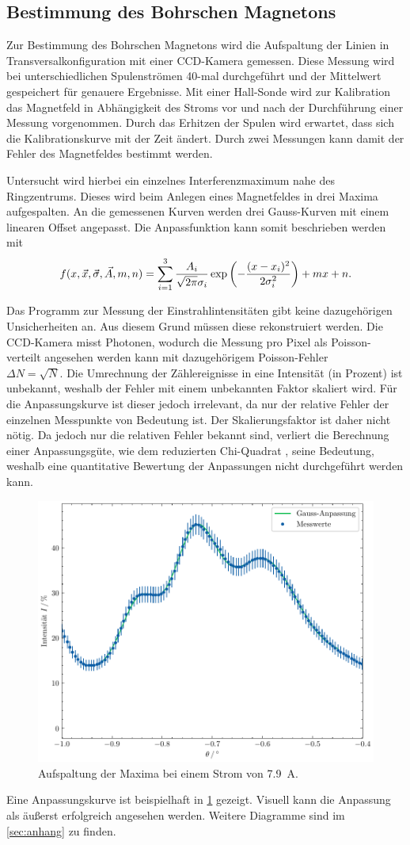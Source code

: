 \subsection{Bestimmung des Bohrschen Magnetons}
Zur Bestimmung des Bohrschen Magnetons wird die Aufspaltung der Linien 
in Transversalkonfiguration mit einer CCD-Kamera gemessen. Diese Messung wird 
bei unterschiedlichen Spulenströmen 40-mal durchgeführt und der Mittelwert 
gespeichert für genauere Ergebnisse. Mit einer Hall-Sonde wird 
zur Kalibration das Magnetfeld in Abhängigkeit des Stroms vor und nach der Durchführung
einer Messung vorgenommen. Durch das Erhitzen der Spulen wird erwartet, dass sich 
die Kalibrationskurve mit der Zeit ändert. Durch zwei Messungen kann damit der Fehler des 
Magnetfeldes bestimmt werden.

Untersucht wird hierbei ein einzelnes Interferenzmaximum nahe des Ringzentrums. Dieses wird 
beim Anlegen eines Magnetfeldes in drei Maxima aufgespalten. An die gemessenen Kurven 
werden drei Gauss-Kurven mit einem linearen Offset angepasst. Die Anpassfunktion kann somit beschrieben werden 
mit 
\begin{equation*}
    f(x, \vec x, \vec \sigma, \vec A, m, n) = \sum_{i=1}^3 \frac{A_i}{\sqrt{2\pi}\sigma_i}
        \exp\qty(-\frac{(x-x_i)^2}{2\sigma_i^2}) +mx + n.
\end{equation*}

Das Programm zur Messung der Einstrahlintensitäten gibt keine dazugehörigen Unsicherheiten an.
Aus diesem Grund müssen diese rekonstruiert werden. Die CCD-Kamera misst Photonen, wodurch 
die Messung pro Pixel als Poisson-verteilt angesehen werden kann mit dazugehörigem Poisson-Fehler \\
$\Delta N = \sqrt{N}$. Die Umrechnung der Zählereignisse in eine Intensität (in Prozent) ist unbekannt, 
weshalb der Fehler mit einem unbekannten Faktor skaliert wird. Für die Anpassungskurve 
ist dieser jedoch irrelevant, da nur der relative Fehler der einzelnen Messpunkte von Bedeutung ist. 
Der Skalierungsfaktor ist daher nicht nötig. Da jedoch nur die relativen Fehler bekannt sind, verliert 
die Berechnung einer Anpassungsgüte, wie dem reduzierten Chi-Quadrat \cite{wiki:reduced_chi_square},
seine Bedeutung, weshalb eine quantitative Bewertung der Anpassungen nicht durchgeführt werden kann.

\begin{figure}
    \centering
    \includegraphics[width=.6\linewidth]{../figs/gauss_i7.9.pdf}
    \caption{Aufspaltung der Maxima bei einem Strom von \SI{7.9}{\ampere}.}
    \label{fig:gauss_i79}
\end{figure}

Eine Anpassungskurve ist beispielhaft in \cref{fig:gauss_i79} gezeigt. Visuell
kann die Anpassung als äußerst erfolgreich angesehen werden. Weitere Diagramme 
sind im \cref{sec:anhang} zu finden.